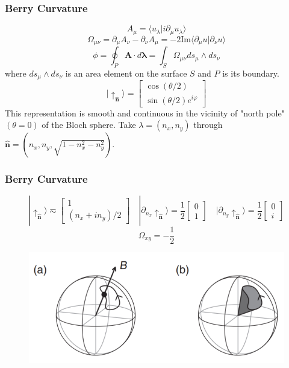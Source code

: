 \documentclass{beamer}
\begin{document}
\begin{frame}
\frametitle{Berry Curvature}
\begin{equation}
A_\mu=\langle u_\lambda|i\partial_\mu u_\lambda\rangle
\end{equation}
\begin{equation}
\Omega_{\mu\nu}=\partial_\mu A_\nu-\partial_\nu A_\mu=-2\textrm{Im}\langle\partial_\mu u|\partial_\nu u\rangle
\end{equation}
\begin{equation}
\phi=\oint_P \mathbf{A}\cdot d\mathbf{\lambda}=\int_S\Omega_{\mu\nu}ds_\mu\land ds_\nu
\end{equation}
where $ds_\mu\land ds_\nu$ is an area element on the surface $S$ and $P$ is its boundary.
\begin{equation}
|\uparrow_{\hat{\mathbf{n}}}\rangle=\left[
\begin{array}{c}
\cos(\theta/2)\\
\sin(\theta/2)e^{i\varphi}
\end{array}
\right]
\end{equation}
This representation is smooth and continuous in the vicinity of "north pole"$(\theta=0)$ of the Bloch sphere. Take $\lambda=(n_x,n_y)$ through $\hat{\mathbf{n}}=(n_x,n_y,\sqrt{1-n_x^2-n_y^2})$.
\end{frame}
\begin{frame}
\frametitle{Berry Curvature}
\begin{equation}
|\uparrow_{\hat{\mathbf{n}}}\rangle\eqsim\left[
\begin{array}{c}
1\\
(n_x+in_y)/2
\end{array}
\right]\quad
|\partial_{n_x}\uparrow_{\hat{\mathbf{n}}}\rangle=\frac{1}{2}\left[
\begin{array}{c}
0\\
1
\end{array}
\right]\quad
|\partial_{n_y}\uparrow_{\hat{\mathbf{n}}}\rangle=\frac{1}{2}\left[
\begin{array}{c}
0\\
i
\end{array}
\right]
\end{equation}
$$\Omega_{xy}=-\frac{1}{2}$$
\begin{figure}
\centering
\includegraphics[scale=0.5]{pic/p1.png}
\end{figure}
\end{frame}
\end{document}
